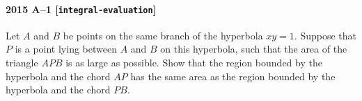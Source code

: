 \paragraph{2015 A--1 \textnormal{[\texttt{integral-evaluation}]}}
Let $A$ and $B$ be points on the same branch of the hyperbola $xy=1$. Suppose that $P$ is a point lying between $A$ and $B$ on this hyperbola, such that the area of the triangle $APB$ is as large as possible. Show that the region bounded by the hyperbola and the chord $AP$ has the same area as the region bounded by the hyperbola and the chord $PB$.
